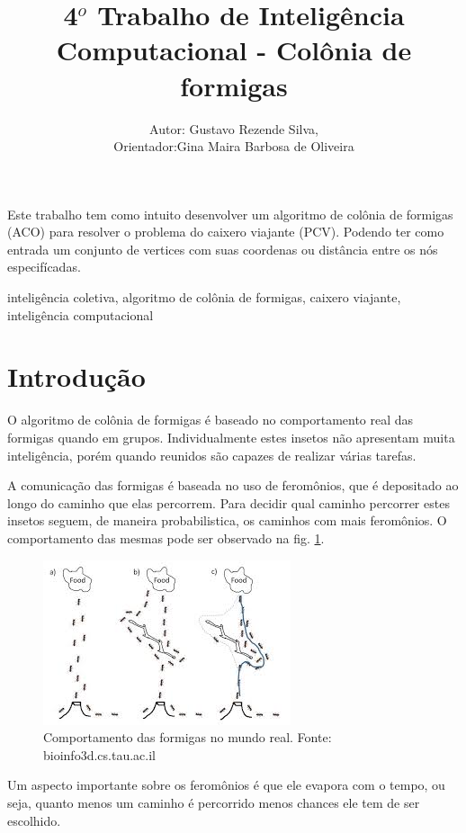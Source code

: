 \documentclass[11pt]{article}
\title{4$^o$ Trabalho de Inteligência Computacional - Colônia de formigas}
\author{Autor: Gustavo Rezende Silva,\\ Orientador:Gina Maira Barbosa
de Oliveira}
\begin{document}
\maketitle


\begin{resumo}
Este trabalho tem como intuito desenvolver um algoritmo de colônia de formigas (ACO)
para resolver o problema do caixero viajante (PCV). Podendo ter como entrada um
conjunto de vertices com suas coordenas ou distância entre os nós especifícadas.
\end{resumo}

\begin{palavraschave}
inteligência coletiva, algoritmo de colônia de formigas, caixero viajante, inteligência computacional
\end{palavraschave}

\section{Introdução}
\label{sec:intro}

O algoritmo de colônia de formigas é baseado no comportamento real das formigas
quando em grupos. Individualmente estes insetos não apresentam muita inteligência,
porém quando reunidos são capazes de realizar várias tarefas.

A comunicação das formigas é baseada no uso de feromônios, que é depositado
ao longo do caminho que elas percorrem. Para decidir qual caminho percorrer
estes insetos seguem, de maneira probabilistica, os caminhos com mais feromônios.
O comportamento das mesmas pode ser observado na fig. \ref{fig:ants}.

\begin{figure}[h]
  \centering
  \includegraphics{ants.jpg}
  \caption{Comportamento das formigas no mundo real. Fonte: bioinfo3d.cs.tau.ac.il}
  \label{fig:ants}
\end{figure}

Um aspecto importante sobre os feromônios é que ele evapora com o tempo, ou seja,
quanto menos um caminho é percorrido menos chances ele tem de ser escolhido.
\end{document}
